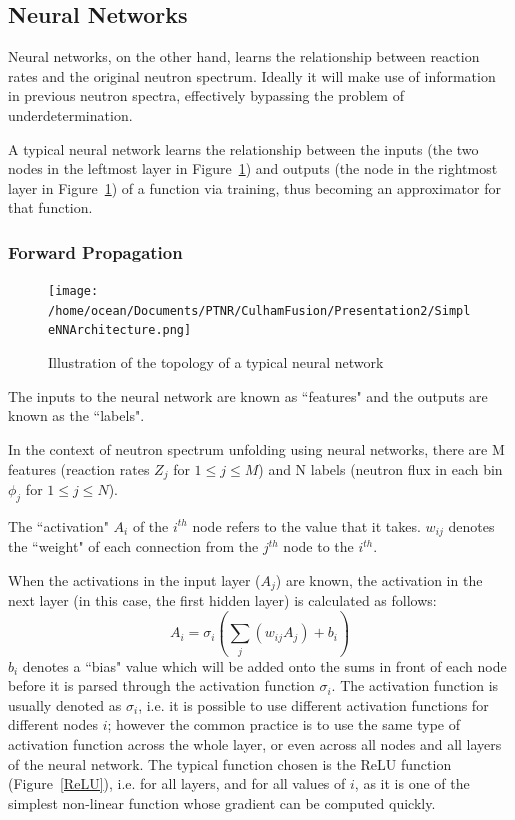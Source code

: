 \documentclass[a4paper, 12pt]{article}
\begin{document}
\subsection{Neural Networks} \label{Neural Network Theory}
Neural networks, on the other hand, learns the relationship between reaction rates and the original neutron spectrum. Ideally it will make use of information in previous neutron spectra, effectively bypassing the problem of underdetermination.

A typical neural network learns the relationship between the inputs (the two nodes in the leftmost layer in Figure~\ref{SimpleNNArchitecture}) and outputs (the node in the rightmost layer in Figure~\ref{SimpleNNArchitecture}) of a function via training, thus becoming an approximator for that function.

\subsubsection{Forward Propagation}
\begin{figure}[H]
    \centering
    \texttt{[image: /home/ocean/Documents/PTNR/CulhamFusion/Presentation2/SimpleNNArchitecture.png]}
    \caption{Illustration of the topology of a typical neural network} \label{SimpleNNArchitecture}
\end{figure}

The inputs to the neural network are known as ``features" and the outputs are known as the ``labels".

In the context of neutron spectrum unfolding using neural networks, there are M features (reaction rates $Z_j$ for $1\le j\le M$) and N labels (neutron flux in each bin $\phi_j$ for $1 \le j \le N$). 

The ``activation" $A_i$ of the $i^{th}$ node refers to the value that it takes.
$w_{ij}$ denotes the ``weight" of each connection from the $j^{th}$ node to the $i^{th}$.

When the activations in the input layer ($A_j$) are known, the activation in the next layer (in this case, the first hidden layer) is calculated as follows:
\begin{equation} \label{forwardpropagation}
    A_i = \sigma_i\left({\sum_{j} (w_{ij}A_j) + b_i}\right)
\end{equation}
$b_{i}$ denotes a ``bias" value which will be added onto the sums in front of each node before it is parsed through the activation function $\sigma_i$.
The activation function is usually denoted as $\sigma_{i}$, i.e. it is possible to use different activation functions for different nodes $i$; however the common practice is to use the same type of activation function across the whole layer, or even across all nodes and all layers of the neural network. The typical function chosen is the ReLU function (Figure~\ref{ReLU}), i.e. for all layers, and for all values of $i$, as it is one of the simplest non-linear function whose gradient can be computed quickly.
\end{document}

